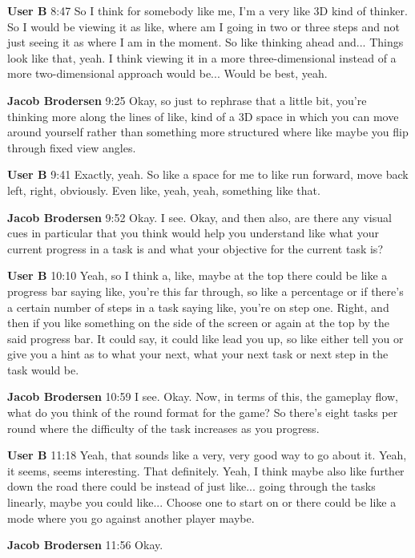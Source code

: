 \documentclass{article}
\begin{document}
\noindent \textbf{User B}   8:47
So I think for somebody like me, I'm a very like 3D kind of thinker. So I would be viewing it as like, where am I going in two or three steps and not just seeing it as
where I am in the moment. So like thinking ahead and...
Things look like that, yeah. I think viewing it in a more three-dimensional instead of a more two-dimensional approach would be...
Would be best, yeah.

\noindent \textbf{Jacob Brodersen}   9:25
Okay, so just to rephrase that a little bit, you're thinking more along the lines of like, kind of a 3D space in which you can move around yourself rather than something more structured where like maybe you flip through fixed view angles.

\noindent \textbf{User B}   9:41
Exactly, yeah. So like a space for me to like run forward, move back left, right, obviously. Even like, yeah, yeah, something like that.

\noindent \textbf{Jacob Brodersen}   9:52
Okay.
I see. Okay, and then also, are there any visual cues in particular that you think would help you understand like what your current progress in a task is and what your objective for the current task is?

\noindent \textbf{User B}   10:10
Yeah, so I think a, like, maybe at the top there could be like a progress bar saying like, you're this far through, so like a percentage or if there's a certain number of steps in a task saying like, you're on step one.
Right, and then if you like something on the side of the screen or again at the top by the said progress bar.
It could say, it could like lead you up, so like either tell you or give you a hint as to what your next, what your next task or next step in the task would be.

\noindent \textbf{Jacob Brodersen}   10:59
I see. Okay. Now, in terms of this, the gameplay flow, what do you think of the round format for the game? So there's eight tasks per round where the difficulty of the task increases as you progress.

\noindent \textbf{User B}   11:18
Yeah, that sounds like a very, very good way to go about it.
Yeah, it seems, seems interesting. That definitely.
Yeah, I think maybe also like further down the road there could be instead of just like...
going through the tasks linearly, maybe you could like...
Choose one to start on or there could be like a mode where you go against another player maybe.

\noindent \textbf{Jacob Brodersen}   11:56
Okay.
\end{document}
